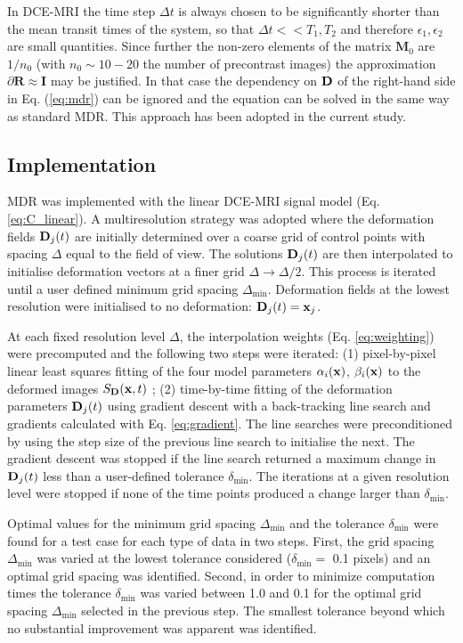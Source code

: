 \documentclass[num-refs]{wiley-article}
\newcommand{\x}{{\bf x}}
\newcommand{\D}{{\bf D}}
\begin{document}
In DCE-MRI the time step $\Delta t$ is always chosen to be significantly shorter than the mean transit times of the system, so that $\Delta t << T_1, T_2$ and therefore $\epsilon_1,\epsilon_2$ are small quantities. Since further the non-zero elements of the matrix ${\mathbf M}_0$ are $1/n_0$ (with $n_0 \sim 10-20$ the number of precontrast images) the approximation $\partial {\mathbf R} \approx {\mathbf I} $ may be justified. In that case the dependency on $\D$ of the right-hand side in Eq. (\ref{eq:mdr}) can be ignored and the equation can be solved in the same way as standard MDR. This approach has been adopted in the current study.

\subsection{Implementation}

MDR was implemented with the linear DCE-MRI signal model (Eq. \ref{eq:C_linear}). A multiresolution strategy was adopted where the deformation fields $\D_j(t)$ are initially determined over a coarse grid of control points with spacing $\Delta$ equal to the field of view. The solutions $\D_j(t)$ are then interpolated to initialise deformation vectors at a finer grid $\Delta \rightarrow \Delta/2$. This process is iterated until a user defined minimum grid spacing $\Delta_\textrm{min}$. Deformation fields at the lowest resolution were initialised to no deformation: $\D_j(t) = \x_j$. 

At each fixed resolution level $\Delta$, the interpolation weights (Eq. \ref{eq:weighting}) were precomputed and the following two steps were iterated: (1) pixel-by-pixel linear least squares fitting of the four model parameters $\alpha_i(\x)$, $ \beta_i(\x)$ to the deformed images $S_\D(\x,t)$ \cite{Flouri2016}; (2) time-by-time fitting of the deformation parameters $\D_j(t)$ using gradient descent with a back-tracking line search and gradients calculated with Eq. \ref{eq:gradient}. The line searches were preconditioned by using the step size of the previous line search to initialise the next. The gradient descent was stopped if the line search returned a maximum change in $\D_j(t)$ less than a user-defined tolerance $\delta_\textrm{min}$. The iterations at a given resolution level were stopped if none of the time points produced a change larger than $\delta_\textrm{min}$.   

Optimal values for the minimum grid spacing $\Delta_\textrm{min}$ and the tolerance $\delta_\textrm{min}$ were found for a test case for each type of data in two steps. First, the grid spacing $\Delta_\textrm{min}$ was varied at the lowest tolerance considered ($\delta_\textrm{min}=$ 0.1 pixels) and an optimal grid spacing was identified. Second, in order to minimize computation times the tolerance $\delta_\textrm{min}$ was varied between 1.0 and 0.1 for the optimal grid spacing $\Delta_\textrm{min}$ selected in the previous step. The smallest tolerance beyond which no substantial improvement was apparent was identified. 
\end{document}
